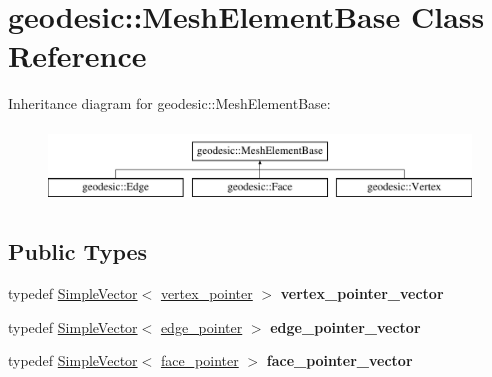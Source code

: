 \hypertarget{classgeodesic_1_1_mesh_element_base}{}\section{geodesic\+:\+:Mesh\+Element\+Base Class Reference}
\label{classgeodesic_1_1_mesh_element_base}
Inheritance diagram for geodesic\+:\+:Mesh\+Element\+Base\+:\begin{figure}[H]
\begin{center}
\leavevmode
\includegraphics[height=2.000000cm]{classgeodesic_1_1_mesh_element_base}
\end{center}
\end{figure}
\subsection*{Public Types}
\begin{DoxyCompactItemize}
\item 
\hypertarget{classgeodesic_1_1_mesh_element_base_a8a106ee1a2039c65b2303b4cfc9bef86}{}typedef \hyperlink{classgeodesic_1_1_simple_vector}{Simple\+Vector}$<$ \hyperlink{classgeodesic_1_1_vertex}{vertex\+\_\+pointer} $>$ {\bfseries vertex\+\_\+pointer\+\_\+vector}\label{classgeodesic_1_1_mesh_element_base_a8a106ee1a2039c65b2303b4cfc9bef86}

\item 
\hypertarget{classgeodesic_1_1_mesh_element_base_a1b1600d4056b0dbddf6912c37306d200}{}typedef \hyperlink{classgeodesic_1_1_simple_vector}{Simple\+Vector}$<$ \hyperlink{classgeodesic_1_1_edge}{edge\+\_\+pointer} $>$ {\bfseries edge\+\_\+pointer\+\_\+vector}\label{classgeodesic_1_1_mesh_element_base_a1b1600d4056b0dbddf6912c37306d200}

\item 
\hypertarget{classgeodesic_1_1_mesh_element_base_a2d020d9d785ece39e2c1d930387fdd37}{}typedef \hyperlink{classgeodesic_1_1_simple_vector}{Simple\+Vector}$<$ \hyperlink{classgeodesic_1_1_face}{face\+\_\+pointer} $>$ {\bfseries face\+\_\+pointer\+\_\+vector}\label{classgeodesic_1_1_mesh_element_base_a2d020d9d785ece39e2c1d930387fdd37}

\end{DoxyCompactItemize}
